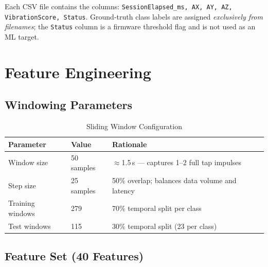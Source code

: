 \documentclass[12pt,a4paper]{report}
\begin{document}
Each CSV file contains the columns:
\texttt{SessionElapsed\_ms, AX, AY, AZ, VibrationScore, Status}.
Ground-truth class labels are assigned \emph{exclusively from filenames};
the \texttt{Status} column is a firmware threshold flag and is not used
as an ML target.

\section{Feature Engineering}

\subsection{Windowing Parameters}

\begin{table}[H]
  \centering
  \caption{Sliding Window Configuration}
  \label{tab:window}
  \begin{tabular}{lll}
    \toprule
    \textbf{Parameter} & \textbf{Value} & \textbf{Rationale} \\
    \midrule
    Window size      & 50 samples & $\approx$1.5\,s --- captures 1--2 full tap impulses \\
    Step size        & 25 samples & 50\% overlap; balances data volume and latency \\
    Training windows & 279        & 70\% temporal split per class \\
    Test windows     & 115        & 30\% temporal split (23 per class) \\
    \bottomrule
  \end{tabular}
\end{table}

\subsection{Feature Set (40 Features)}
\end{document}
